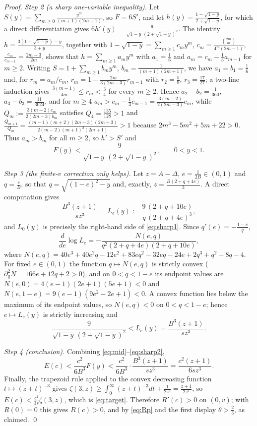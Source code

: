 \documentclass[11pt,a4paper]{amsart}
\theoremstyle{definition}
\begin{document}
\begin{proof}
\emph{Step 2 (a sharp one-variable inequality).} Let
$S(y)=\sum_{m\ge0}\frac{y^{m}}{(m+1)(2m+1)}$, so $F=6S'$, and let
$h(y)=\frac{1-\sqrt{1-y}}{2+\sqrt{1-y}}$, for which a direct differentiation gives
$6h'(y)=\frac{9}{\sqrt{1-y}\,(2+\sqrt{1-y})^{2}}$. The identity
$h=\frac{3(1-\sqrt{1-y})-y}{3+y}$, together with
$1-\sqrt{1-y}=\sum_{m\ge1}c_my^{m}$,
$c_m=\frac{\binom{2m}{m}}{4^{m}(2m-1)}$, $\frac{c_m}{c_{m-1}}=\frac{2m-3}{2m}$, shows
that $h=\sum_{m\ge1}a_my^{m}$ with $a_1=\frac16$ and
$a_m=c_m-\frac13a_{m-1}$ for $m\ge2$. Writing $S=1+\sum_{m\ge1}b_my^{m}$,
$b_m=\frac{1}{(m+1)(2m+1)}$, we have $a_1=b_1=\frac16$ and, for $r_m=a_m/c_m$,
$r_m=1-\frac{2m}{3(2m-3)}r_{m-1}$ with $r_2=\frac59$, $r_3=\frac{17}{27}$; a two-line
induction gives $\frac{3(m-1)}{4m}\le r_m<\frac34$ for every $m\ge2$. Hence
$a_2-b_2=\frac{1}{360}$, $a_3-b_3=\frac{11}{3024}$, and for $m\ge4$
$a_m>c_m-\frac14c_{m-1}=\frac{3(m-2)}{2(2m-3)}c_m$, while
$Q_m:=\frac{3(m-2)c_m}{2(2m-3)b_m}$ satisfies $Q_4=\frac{135}{128}>1$ and
$\frac{Q_{m+1}}{Q_m}=\frac{(m-1)(m+2)(2m-3)(2m+3)}{2(m-2)(m+1)^{2}(2m+1)}>1$ because
$2m^{3}-5m^{2}+5m+22>0$. Thus $a_m>b_m$ for all $m\ge2$, so $h'>S'$ and
\begin{equation}\label{eq:sharp1}
  F(y)<\frac{9}{\sqrt{1-y}\,(2+\sqrt{1-y})^{2}},\qquad 0<y<1 .
\end{equation}

\emph{Step 3 (the finite-$v$ correction only helps).} Let $z=A-\Delta$,
$e=\frac{1}{2B}\in(0,1)$ and $q=\frac{s}{B}$, so that
$q=\sqrt{(1-e)^{2}-y}$ and, exactly, $z=\frac{B(2+q+4e)}{3}$. A direct computation gives
\[
  \frac{B^{3}(z+1)}{sz^{3}}=L_e(y):=\frac{9\,(2+q+10e)}{q\,(2+q+4e)^{3}},
\]
and $L_0(y)$ is precisely the right-hand side of \eqref{eq:sharp1}. Since
$q'(e)=-\frac{1-e}{q}$,
\[
  \frac{d}{de}\log L_e=-\frac{N(e,q)}{q^{2}(2+q+4e)(2+q+10e)},
\]
where
$N(e,q)=40e^{3}+40e^{2}q-12e^{2}+83eq^{2}-32eq-24e+2q^{3}+q^{2}-8q-4$. For fixed
$e\in(0,1)$ the function $q\mapsto N(e,q)$ is strictly convex
($\partial_{q}^{2}N=166e+12q+2>0$), and on $0<q<1-e$ its endpoint values are
$N(e,0)=4(e-1)(2e+1)(5e+1)<0$ and
$N(e,1-e)=9(e-1)(9e^{2}-2e+1)<0$. A convex function lies below the maximum of its
endpoint values, so $N(e,q)<0$ on $0<q<1-e$; hence $e\mapsto L_e(y)$ is strictly
increasing and
\begin{equation}\label{eq:sharp2}
  \frac{9}{\sqrt{1-y}\,(2+\sqrt{1-y})^{2}}<L_e(y)=\frac{B^{3}(z+1)}{sz^{3}} .
\end{equation}

\emph{Step 4 (conclusion).} Combining \eqref{eq:mid}--\eqref{eq:sharp2},
\[
  E(c)<\frac{c^{2}}{6B^{3}}F(y)<\frac{c^{2}}{6B^{3}}\cdot\frac{B^{3}(z+1)}{sz^{3}}
        =\frac{c^{2}(z+1)}{6sz^{3}} .
\]
Finally, the trapezoid rule applied to the convex decreasing function
$t\mapsto(z+t)^{-3}$ gives
$\zeta(3,z)\ge\int_{0}^{\infty}(z+t)^{-3}dt+\frac{1}{2z^{3}}=\frac{z+1}{2z^{3}}$, so
$E(c)<\frac{c^{2}}{3s}\zeta(3,z)$, which is \eqref{eq:target}. Therefore $R'(c)>0$ on
$(0,v)$; with $R(0)=0$ this gives $R(c)>0$, and by \eqref{eq:Rp} and the first display
$\theta>\frac23$, as claimed. \qed
\end{proof}
\end{document}
